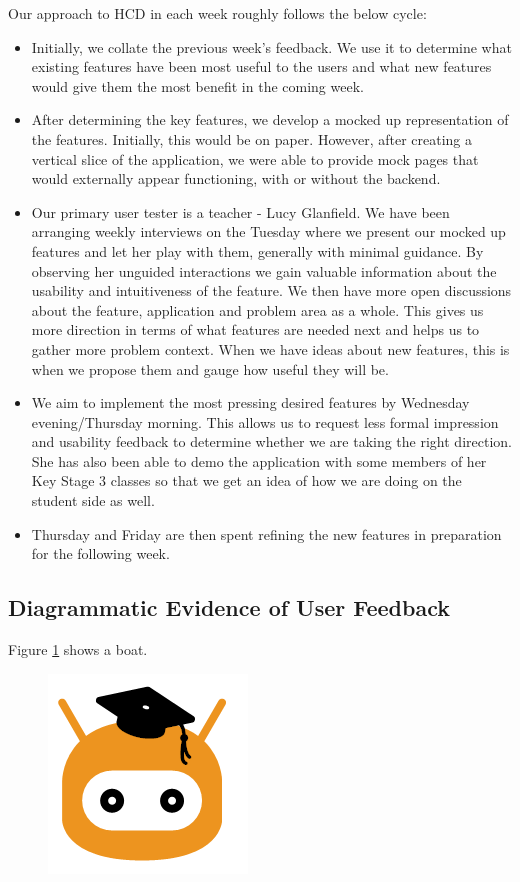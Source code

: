 \documentclass[a4wide, 11pt]{article}
\begin{document}
Our approach to HCD in each week roughly follows the below cycle:
\begin{itemize}
  \item Initially, we collate the previous week's feedback. We use it to determine what existing features have been most useful to the users and what new features would give them the most benefit in the coming week.
  \item After determining the key features, we develop a mocked up representation of the features. Initially, this would be on paper. However, after creating a vertical slice of the application, we were able to provide mock pages that would externally appear functioning, with or without the backend.
  \item Our primary user tester is a teacher - Lucy Glanfield. We have been arranging weekly interviews on the Tuesday where we present our mocked up features and let her play with them, generally with minimal guidance. By observing her unguided interactions we gain valuable information about the usability and intuitiveness of the feature. We then have more open discussions about the feature, application and problem area as a whole. This gives us more direction in terms of what features are needed next and helps us to gather more problem context. When we have ideas about new features, this is when we propose them and gauge how useful they will be.
  \item We aim to implement the most pressing desired features by Wednesday evening/Thursday morning. This allows us to request less formal impression and usability feedback to determine whether we are taking the right direction. She has also been able to demo the application with some members of her Key Stage 3 classes so that we get an idea of how we are doing on the student side as well.
  \item Thursday and Friday are then spent refining the new features in preparation for the following week.
\end{itemize}

\subsection{Diagrammatic Evidence of User Feedback}

Figure \ref{fig:mockup} shows a boat.

\begin{figure}
  \begin{center}
  \includegraphics[]{placeholder.png}
  \end{center}
  \label{fig:mockup}
\end{figure}
\end{document}
